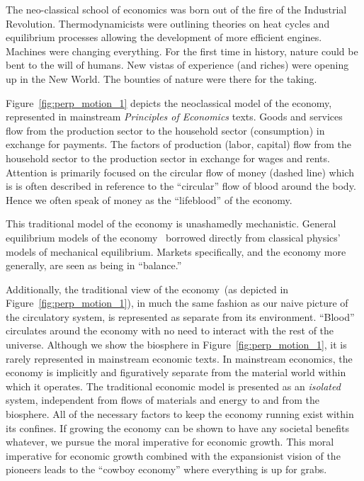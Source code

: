 The neo-classical school of economics 
was born out of the fire of the Industrial Revolution.
Thermodynamicists were outlining theories on 
heat cycles and equilibrium processes allowing
the development of more efficient engines.
Machines were changing everything.
For the first time in history,
nature could be bent to the will of humans.
New vistas of experience (and riches) were
opening up in the New World.
The bounties of nature were there for the taking.

Figure~\ref{fig:perp_motion_1} 
depicts the neoclassical model of the economy,
represented in mainstream \emph{Principles of Economics} texts.
Goods and services flow from the production sector
to the household sector (consumption)
in exchange for payments.
The factors of production (labor, capital)
flow from the household sector to the
production sector in exchange for wages and rents.
Attention is primarily focused on the circular flow
of money (dashed line) which is
is often described in reference to 
the ``circular'' flow of blood around the body.
Hence we often speak of money as the
``lifeblood'' of the economy.

This traditional model of the economy is unashamedly mechanistic.
General equilibrium models of the economy~\cite{Walras1892, Walras1993}
borrowed directly from classical physics' models of 
mechanical equilibrium.\cite{Ingrao1990}
Markets specifically,
and the economy more generally,
are seen as being in ``balance.''

Additionally,
the traditional view of the economy~(as
depicted in Figure~\ref{fig:perp_motion_1}),
in much the same fashion as our naive picture of
the circulatory system,
is represented as separate from its environment.
``Blood'' circulates around the economy
with no need to interact with the rest of the universe.
Although we show the biosphere in
Figure~\ref{fig:perp_motion_1}, 
it is rarely represented in mainstream economic texts. 
In mainstream economics, 
the economy is implicitly and figuratively separate from 
the material world within which it operates.
The traditional economic model is presented as 
an \emph{isolated} system, 
independent from flows of materials and energy 
to and from the biosphere.
All of the necessary factors to keep the economy
running exist within its confines.
If growing the economy can be shown to have any
societal benefits whatever,
we pursue the moral imperative for economic growth.
This moral imperative for economic growth 
combined with the expansionist vision of the pioneers
leads to the ``cowboy economy''
where everything is up for grabs.\cite{Boulding1966}

